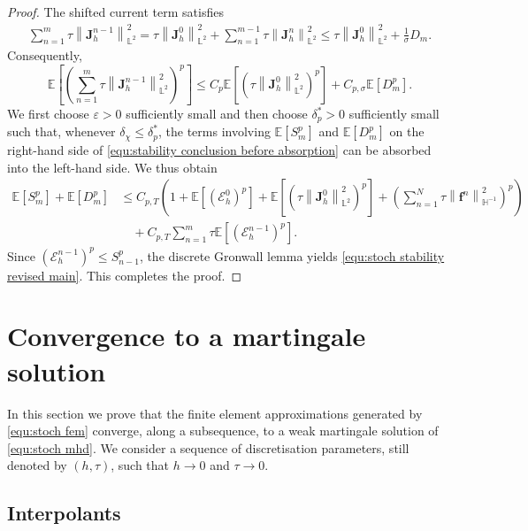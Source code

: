 \documentclass[11pt, reqno]{amsart}
\theoremstyle{definition}
\numberwithin{equation}{section}
\newcommand{\bff}{\boldsymbol}
\newcommand{\bb}{\mathbb}
\newcommand{\norm}[2]{\left\|{#1}\right\|_{#2}}
\begin{document}
\begin{proof}
	The shifted current term satisfies
	\begin{align*}
		\sum_{n=1}^{m}
		\tau\norm{\bff J_h^{n-1}}{\bb L^2}^2
		=
		\tau\norm{\bff J_h^0}{\bb L^2}^2
		+
		\sum_{n=1}^{m-1}
		\tau\norm{\bff J_h^n}{\bb L^2}^2
		\le
		\tau\norm{\bff J_h^0}{\bb L^2}^2
		+
		\frac{1}{\sigma}D_m.
	\end{align*}
	Consequently,
	\[
	\bb E\left[
	\left(
	\sum_{n=1}^{m}
	\tau\norm{\bff J_h^{n-1}}{\bb L^2}^2
	\right)^p
	\right]
	\le
	C_p\bb E\left[
	\left(
	\tau\norm{\bff J_h^0}{\bb L^2}^2
	\right)^p
	\right]
	+
	C_{p,\sigma}\bb E[D_m^p].
	\]
	We first choose $\varepsilon>0$ sufficiently small and then choose
	$\delta_p^\ast>0$ sufficiently small such that, whenever
	$\delta_\chi\le\delta_p^\ast$, the terms involving
	$\bb E[S_m^p]$ and $\bb E[D_m^p]$ on the right-hand side of
	\eqref{equ:stability conclusion before absorption} can be absorbed into
	the left-hand side. We thus obtain
	\begin{align*}
		\bb E[S_m^p]
		+
		\bb E[D_m^p]
		&\le
		C_{p,T}
		\left(
		1
		+
		\bb E[(\mathcal E_h^0)^p]
		+
		\bb E\left[
		\left(
		\tau\norm{\bff J_h^0}{\bb L^2}^2
		\right)^p
		\right]
		+
		\left(
		\sum_{n=1}^{N}
		\tau\norm{\bff f^n}{\bb H^{-1}}^2
		\right)^p
		\right)
		\\
		&\quad
		+
		C_{p,T}
		\sum_{n=1}^{m}
		\tau\bb E[(\mathcal E_h^{n-1})^p].
	\end{align*}
	Since $(\mathcal E_h^{n-1})^p\le S_{n-1}^p$, the discrete Gronwall
	lemma yields \eqref{equ:stoch stability revised main}. This completes the
	proof.
\end{proof}



\section{Convergence to a martingale solution}
\label{sec:stoch convergence}

In this section we prove that the finite element approximations generated by \eqref{equ:stoch fem} converge, along a subsequence, to a weak martingale solution of \eqref{equ:stoch mhd}. We consider a sequence of discretisation parameters, still denoted by $(h,\tau)$, such that $h\to0$ and $\tau\to0$.


\subsection{Interpolants}
\end{document}
